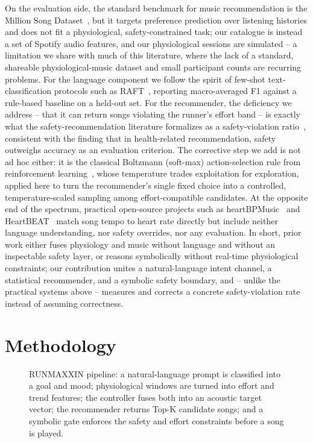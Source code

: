 \documentclass[11pt,a4paper]{article}
\newcommand{\figplaceholder}[2]{%
	\fbox{\begin{minipage}[c][#2][c]{#1}\centering\itshape figure placeholder\end{minipage}}}
\begin{document}
	On the evaluation side, the standard benchmark for music recommendation is the Million Song Dataset~\cite{bertin2011msd}, but it targets preference prediction over listening histories and does not fit a physiological, safety-constrained task; our catalogue is instead a set of Spotify audio features, and our physiological sessions are simulated -- a limitation we share with much of this literature, where the lack of a standard, shareable physiological-music dataset and small participant counts are recurring problems. For the language component we follow the spirit of few-shot text-classification protocols such as RAFT~\cite{alex2021raft}, reporting macro-averaged F1 against a rule-based baseline on a held-out set. For the recommender, the deficiency we address -- that it can return songs violating the runner's effort band -- is exactly what the safety-recommendation literature formalizes as a safety-violation ratio~\cite{safecrs2026}, consistent with the finding that in health-related recommendation, safety outweighs accuracy as an evaluation criterion. The corrective step we add is not ad hoc either: it is the classical Boltzmann (soft-max) action-selection rule from reinforcement learning~\cite{sutton2018rl}, whose temperature trades exploitation for exploration, applied here to turn the recommender's single fixed choice into a controlled, temperature-scaled sampling among effort-compatible candidates. At the opposite end of the spectrum, practical open-source projects such as heartBPMusic~\cite{wu2020heartbpmusic} and HeartBEAT~\cite{ray2018heartbeat} match song tempo to heart rate directly but include neither language understanding, nor safety overrides, nor any evaluation. In short, prior work either fuses physiology and music without language and without an inspectable safety layer, or reasons symbolically without real-time physiological constraints; our contribution unites a natural-language intent channel, a statistical recommender, and a symbolic safety boundary, and -- unlike the practical systems above -- measures and corrects a concrete safety-violation rate instead of assuming correctness.

	\section{Methodology}

	\begin{figure}[t]
		\centering
		\figplaceholder{0.98\textwidth}{4cm}
		\caption{RUNMAXXIN pipeline: a natural-language prompt is classified into a goal and mood; physiological windows are turned into effort and trend features; the controller fuses both into an acoustic target vector; the recommender returns Top-K candidate songs; and a symbolic gate enforces the safety and effort constraints before a song is played.}
		\label{fig:architecture}
	\end{figure}
\end{document}
